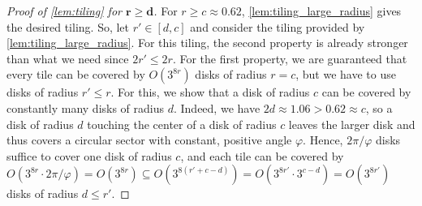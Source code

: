 \documentclass[11pt]{article}
\renewcommand{\phi}{\varphi}
\begin{document}
\begin{proof}%
[Proof of \cref{lem:tiling} for $ \bm{r \geq d} $]
%
    For $ r \geq c \approx 0.62 $, \cref{lem:tiling_large_radius} gives the desired tiling.
    So, let $ r' \in [d, c] $ and consider the tiling provided by 
    \cref{lem:tiling_large_radius}.
    For this tiling, the second property is already stronger than what we need since $ 2r' \leq 2r $.
    For the first property, we are guaranteed that every tile can be covered by $ O(3^{8r}) $ disks of radius $ r = c $, but we have to use disks of radius $ r' \leq r $.
    For this, we show that a disk of radius $ c $ can be covered by constantly many disks of radius $ d $.
    Indeed, we have $ 2d \approx 1.06 > 0.62 \approx c $, so a disk of radius $ d $ touching the center of a disk of radius $ c $ leaves the larger disk and thus covers a circular sector with constant, positive angle $ \phi $.
    Hence, $ 2 \pi / \phi $ disks suffice to cover one disk of radius $ c $, and each tile can be covered by 
    $ O(3^{8r} \cdot 2 \pi / \phi) 
        = O(3^{8r}) 
        \subseteq O(3^{8(r' + c - d)}) 
        = O(3^{8 r'} \cdot 3^{c - d}) 
        = O(3^{8r'}) $ 
    disks of radius $ d \leq r' $.
\end{proof}
%
%
\end{document}
